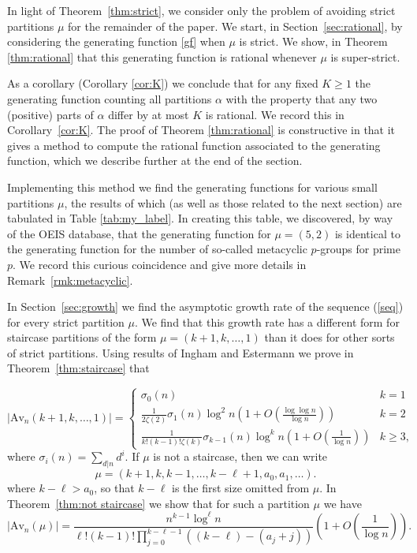 \documentclass{article}
\theoremstyle{plain}
\theoremstyle{definition}
\newcommand{\Av}{\text{Av}}
\begin{document}
In light of Theorem~\ref{thm:strict}, we consider only the problem of avoiding strict partitions $\mu$ for the remainder of the paper. We start, in Section~\ref{sec:rational}, by considering the generating function \eqref{gf} when $\mu$ is strict.  We show, in Theorem \ref{thm:rational} that this generating function is rational whenever $\mu$ is super-strict.

As a corollary (Corollary \ref{cor:K}) we conclude that for any fixed $K\geq 1$ the generating function counting all partitions  $\alpha$ with the property that any two (positive) parts of $\alpha$ differ by at most $K$ is rational.  We record this in Corollary~\ref{cor:K}.  The proof of Theorem \ref{thm:rational} is constructive in that it gives a method to compute the rational function associated to the generating function, which we describe further at the end of the section.  

Implementing this method we find the generating functions for various small partitions $\mu$, the results of which (as well as those related to the next section) are tabulated in Table \ref{tab:my_label}.  In creating this table, we discovered, by way of the OEIS database, that the generating function for $\mu=(5,2)$ is identical to the generating function for the number of so-called metacyclic $p$-groups for prime $p$.  We record this curious coincidence and give more details in Remark~\ref{rmk:metacyclic}.  

In Section~\ref{sec:growth} we find the asymptotic growth rate of the sequence (\ref{seq}) for every strict partition $\mu$. We find that this growth rate has a different form for staircase partitions of the form $\mu=(k+1,k,\ldots, 1)$ than it does for other sorts of strict partitions. Using results of Ingham \cite{Ingham} and Estermann 
\cite{Estermann1,Estermann2} we prove in Theorem~\ref{thm:staircase} that

\begin{equation*}
|\Av_n(k+1,k,\ldots,1)| =\begin{cases}
\sigma_0(n) & k=1  \\
\frac{1}{2\zeta(2)}\sigma_{1}(n)\log^2 n\left(1+O\left(\frac{\log \log n}{\log n}\right)\right) & k=2 \\
\frac{1}{k!(k-1)!\zeta(k)}\sigma_{k-1}(n)\log^k n\left(1+O\left(\frac{1}{\log n}\right)\right) & k\geq 3,
\end{cases}
\end{equation*}
where $\sigma_i(n) = \sum_{d\vert n}d^i$.  If $\mu$ is not a staircase, then we can write 
$$\mu = (k+1,k, k-1,\ldots, k-\ell+1, a_0,a_1,\ldots). $$
where $k-\ell>a_0$, so that $k - \ell$ is the first size omitted from $\mu$.  In Theorem~\ref{thm:not staircase} we show that for such a partition $\mu$ we have
\begin{equation} |\Av_n(\mu)| 
= \frac{n^{k-1}\log^\ell n}{\ell!(k-1)!
\prod_{j=0}^{k-\ell-1}\left((k-\ell) -(a_j+j)\right)}
\left(1+O\left(\frac{1}{\log n}\right)\right). \label{eq:introgencase} \end{equation}
\end{document}

